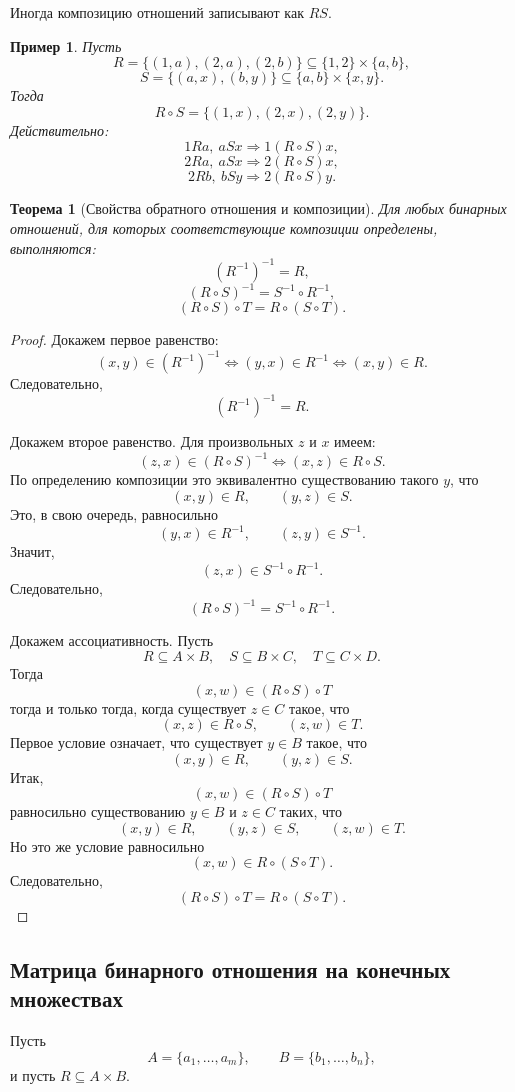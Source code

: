 \documentclass[12pt,a4paper]{article}
\newtheorem{theorem}{Теорема}
\newtheorem{example}{Пример}
\begin{document}
Иногда композицию отношений записывают как $RS$.

\begin{example}
Пусть
\[
R=\{(1,a),(2,a),(2,b)\}\subseteq \{1,2\}\times\{a,b\},
\]
\[
S=\{(a,x),(b,y)\}\subseteq \{a,b\}\times\{x,y\}.
\]
Тогда
\[
R\circ S=\{(1,x),(2,x),(2,y)\}.
\]
Действительно:
\[
1Ra,\ aSx \Rightarrow 1(R\circ S)x,
\]
\[
2Ra,\ aSx \Rightarrow 2(R\circ S)x,
\]
\[
2Rb,\ bSy \Rightarrow 2(R\circ S)y.
\]
\end{example}

\begin{theorem}[Свойства обратного отношения и композиции]
Для любых бинарных отношений, для которых соответствующие композиции определены, выполняются:
\[
(R^{-1})^{-1}=R,
\]
\[
(R\circ S)^{-1}=S^{-1}\circ R^{-1},
\]
\[
(R\circ S)\circ T=R\circ(S\circ T).
\]
\end{theorem}

\begin{proof}
Докажем первое равенство:
\[
(x,y)\in (R^{-1})^{-1}
\iff
(y,x)\in R^{-1}
\iff
(x,y)\in R.
\]
Следовательно,
\[
(R^{-1})^{-1}=R.
\]

Докажем второе равенство. Для произвольных $z$ и $x$ имеем:
\[
(z,x)\in (R\circ S)^{-1}
\iff
(x,z)\in R\circ S.
\]
По определению композиции это эквивалентно существованию такого $y$, что
\[
(x,y)\in R,\qquad (y,z)\in S.
\]
Это, в свою очередь, равносильно
\[
(y,x)\in R^{-1},\qquad (z,y)\in S^{-1}.
\]
Значит,
\[
(z,x)\in S^{-1}\circ R^{-1}.
\]
Следовательно,
\[
(R\circ S)^{-1}=S^{-1}\circ R^{-1}.
\]

Докажем ассоциативность. Пусть
\[
R\subseteq A\times B,\quad S\subseteq B\times C,\quad T\subseteq C\times D.
\]
Тогда
\[
(x,w)\in (R\circ S)\circ T
\]
тогда и только тогда, когда существует $z\in C$ такое, что
\[
(x,z)\in R\circ S,\qquad (z,w)\in T.
\]
Первое условие означает, что существует $y\in B$ такое, что
\[
(x,y)\in R,\qquad (y,z)\in S.
\]
Итак,
\[
(x,w)\in (R\circ S)\circ T
\]
равносильно существованию $y\in B$ и $z\in C$ таких, что
\[
(x,y)\in R,\qquad (y,z)\in S,\qquad (z,w)\in T.
\]
Но это же условие равносильно
\[
(x,w)\in R\circ(S\circ T).
\]
Следовательно,
\[
(R\circ S)\circ T=R\circ(S\circ T).
\]
\end{proof}

\subsection{Матрица бинарного отношения на конечных множествах}

Пусть
\[
A=\{a_1,\dots,a_m\},\qquad B=\{b_1,\dots,b_n\},
\]
и пусть $R\subseteq A\times B$.
\end{document}
